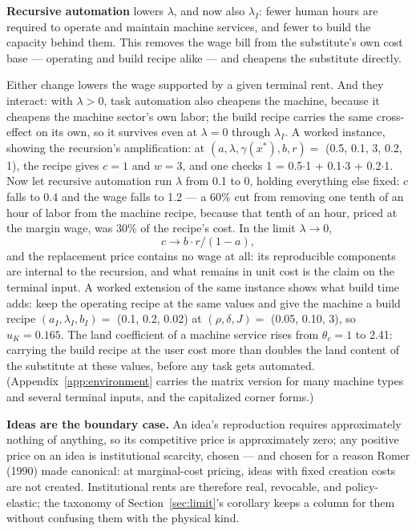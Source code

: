 \documentclass[12pt]{article}
\theoremstyle{plain}
\begin{document}
\textbf{Recursive automation} lowers $\lambda$, and now also $\lambda _I$: fewer human hours are required to operate and maintain machine services, and fewer to build the capacity behind them. This removes the wage bill from the substitute's own cost base --- operating and build recipe alike --- and cheapens the substitute directly.

Either change lowers the wage supported by a given terminal rent. And they interact: with $\lambda > 0$, task automation also cheapens the machine, because it cheapens the machine sector's own labor; the build recipe carries the same cross-effect on its own, so it survives even at $\lambda = 0$ through $\lambda _I$. A worked instance, showing the recursion's amplification: at $(a, \lambda , \gamma (x^*), b, r) =$ (0.5, 0.1, 3, 0.2, 1), the recipe gives $c = 1$ and $w = 3$, and one checks 1 = 0.5$\cdot$1 + 0.1$\cdot$3 + 0.2$\cdot$1. Now let recursive automation run $\lambda$ from 0.1 to 0, holding everything else fixed: $c$ falls to 0.4 and the wage falls to 1.2 --- a 60\% cut from removing one tenth of an hour of labor from the machine recipe, because that tenth of an hour, priced at the margin wage, was 30\% of the recipe's cost. In the limit $\lambda \to 0$,
\begin{equation}\label{eq:lambda-zero}
c \to b\cdot r/(1 - a),
\end{equation}
and the replacement price contains no wage at all: its reproducible components are internal to the recursion, and what remains in unit cost is the claim on the terminal input. A worked extension of the same instance shows what build time adds: keep the operating recipe at the same values and give the machine a build recipe $(a_I, \lambda _I, b_I) =$ (0.1, 0.2, 0.02) at $(\rho , \delta , J) =$ (0.05, 0.10, 3), so $u_K = 0.165$. The land coefficient of a machine service rises from $\theta _c = 1$ to 2.41: carrying the build recipe at the user cost more than doubles the land content of the substitute at these values, before any task gets automated. (Appendix~\ref{app:environment} carries the matrix version for many machine types and several terminal inputs, and the capitalized corner forms.)

\textbf{Ideas are the boundary case.} An idea's reproduction requires approximately nothing of anything, so its competitive price is approximately zero; any positive price on an idea is institutional scarcity, chosen --- and chosen for a reason Romer (1990) made canonical: at marginal-cost pricing, ideas with fixed creation costs are not created. Institutional rents are therefore real, revocable, and policy-elastic; the taxonomy of Section~\ref{sec:limit}'s corollary keeps a column for them without confusing them with the physical kind.
\end{document}
